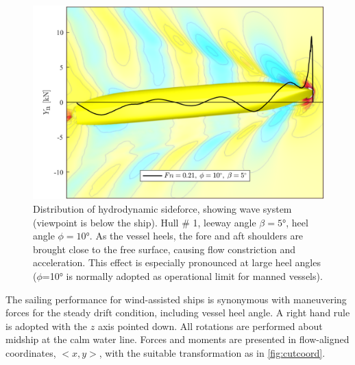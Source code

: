 \documentclass[twoside,twocolumn]{article}
\begin{document}
\begin{figure}[!h]
	\centering
	\includegraphics[width=.7\textwidth]{images/hull1.png}  %
	\caption{Distribution of hydrodynamic sideforce, showing wave system (viewpoint is below the ship).  Hull \# 1, leeway angle $\beta=\ang{5}$, heel angle $\phi=\ang{10}$. As the vessel heels, the fore and aft shoulders are brought close to the free surface, causing flow constriction and acceleration. This effect is especially pronounced at large heel angles ($\phi$=\ang{10} is normally adopted as operational limit for manned vessels).}
	\label{fig:Ynphi}
\end{figure}


The sailing performance for wind-assisted ships is synonymous with maneuvering forces for the steady drift condition, including vessel heel angle. A right hand rule is adopted with the $z$ axis pointed down. All rotations are performed about midship at the calm water line. Forces and moments are presented in flow-aligned coordinates, $<x,y>$, with the suitable transformation as in \cref{fig:cutcoord}.
\end{document}

